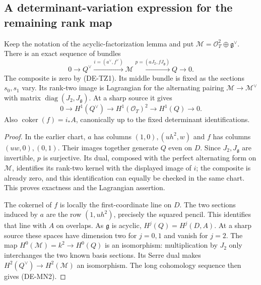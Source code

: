 \subsection{A determinant-variation expression for the remaining rank map}

\begin{lemma}
\label{lem:DE-A3-positive-monad-note}
Keep the notation of the acyclic-factorization lemma and put
$\mathcal M=\mathcal O_T^2\oplus\mathfrak g^\vee$. There is an exact
sequence of bundles
\[
0\longrightarrow Q^\vee\xrightarrow{i=(a^\vee,f^\vee)}
\mathcal M\xrightarrow{p=(aJ_2,fJ_{\mathfrak g})}Q
\longrightarrow0.                                      \tag{DE-MN1}
\]
The composite is zero by (DE-TZ1). Its middle bundle is fixed as
the sections $s_0,s_1$ vary. Its rank-two image is Lagrangian for
the alternating pairing $\mathcal M\to\mathcal M^\vee$
with matrix $\operatorname{diag}(J_2,J_{\mathfrak g})$.
At a sharp source it gives
\[
0\longrightarrow H^1(Q^\vee)\longrightarrow
H^1(\mathcal O_T)^2\longrightarrow H^1(Q)\longrightarrow0.
                                                               \tag{DE-MN2}
\]
Also $\operatorname{coker}(f)=i_*A$, canonically up to the fixed
determinant identifications.
\end{lemma}
\begin{proof}
In the earlier chart, $a$ has columns $(1,0),(uh^2,w)$ and $f$
has columns $(uw,0),(0,1)$. Their images together generate $Q$
even on $D$. Since $J_2,J_{\mathfrak g}$ are invertible, $p$ is
surjective. Its dual, composed with the perfect alternating form on
$\mathcal M$, identifies its rank-two kernel with the displayed
image of $i$; the composite is already zero, and this identification
can equally be checked in the same chart. This proves exactness
and the Lagrangian assertion.

The cokernel of $f$ is locally the first-coordinate line on $D$.
The two sections induced by $a$ are the row $(1,uh^2)$, precisely
the squared pencil. This identifies that line with $A$ on overlaps.
As $\mathfrak g$ is acyclic, $H^j(Q)=H^j(D,A)$.
At a sharp source these spaces have dimension two for $j=0,1$
and vanish for $j=2$. The map $H^0(\mathcal M)=k^2\to H^0(Q)$
is an isomorphism: multiplication by $J_2$ only interchanges the
two known basis sections. Its Serre dual makes
$H^2(Q^\vee)\to H^2(\mathcal M)$ an isomorphism.
The long cohomology sequence then gives (DE-MN2).
\end{proof}

